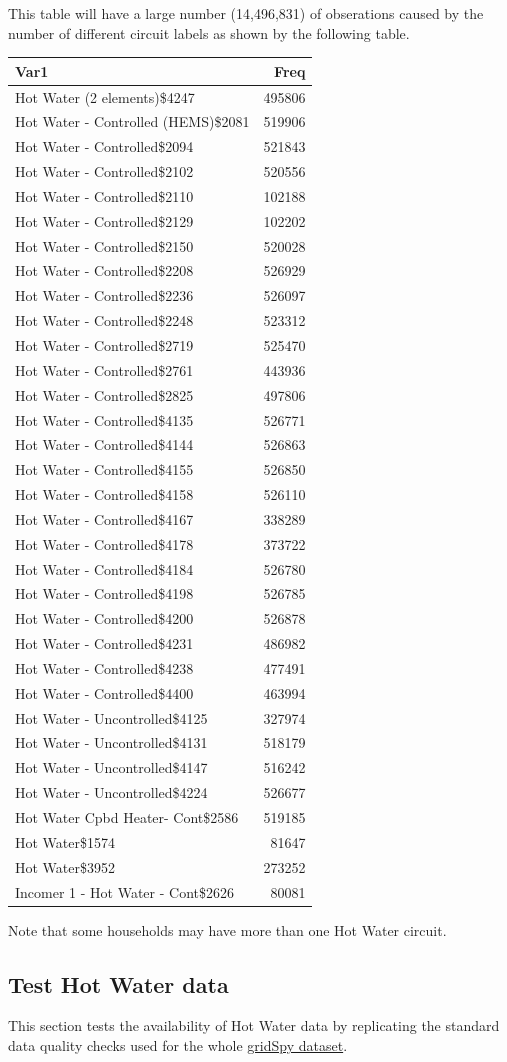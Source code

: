 \documentclass[]{article}
\begin{document}
This table will have a large number (14,496,831) of obserations caused
by the number of different circuit labels as shown by the following
table.

\begin{longtable}[]{@{}lr@{}}
\toprule
Var1 & Freq\tabularnewline
\midrule
\endhead
Hot Water (2 elements)\$4247 & 495806\tabularnewline
Hot Water - Controlled (HEMS)\$2081 & 519906\tabularnewline
Hot Water - Controlled\$2094 & 521843\tabularnewline
Hot Water - Controlled\$2102 & 520556\tabularnewline
Hot Water - Controlled\$2110 & 102188\tabularnewline
Hot Water - Controlled\$2129 & 102202\tabularnewline
Hot Water - Controlled\$2150 & 520028\tabularnewline
Hot Water - Controlled\$2208 & 526929\tabularnewline
Hot Water - Controlled\$2236 & 526097\tabularnewline
Hot Water - Controlled\$2248 & 523312\tabularnewline
Hot Water - Controlled\$2719 & 525470\tabularnewline
Hot Water - Controlled\$2761 & 443936\tabularnewline
Hot Water - Controlled\$2825 & 497806\tabularnewline
Hot Water - Controlled\$4135 & 526771\tabularnewline
Hot Water - Controlled\$4144 & 526863\tabularnewline
Hot Water - Controlled\$4155 & 526850\tabularnewline
Hot Water - Controlled\$4158 & 526110\tabularnewline
Hot Water - Controlled\$4167 & 338289\tabularnewline
Hot Water - Controlled\$4178 & 373722\tabularnewline
Hot Water - Controlled\$4184 & 526780\tabularnewline
Hot Water - Controlled\$4198 & 526785\tabularnewline
Hot Water - Controlled\$4200 & 526878\tabularnewline
Hot Water - Controlled\$4231 & 486982\tabularnewline
Hot Water - Controlled\$4238 & 477491\tabularnewline
Hot Water - Controlled\$4400 & 463994\tabularnewline
Hot Water - Uncontrolled\$4125 & 327974\tabularnewline
Hot Water - Uncontrolled\$4131 & 518179\tabularnewline
Hot Water - Uncontrolled\$4147 & 516242\tabularnewline
Hot Water - Uncontrolled\$4224 & 526677\tabularnewline
Hot Water Cpbd Heater- Cont\$2586 & 519185\tabularnewline
Hot Water\$1574 & 81647\tabularnewline
Hot Water\$3952 & 273252\tabularnewline
Incomer 1 - Hot Water - Cont\$2626 & 80081\tabularnewline
\bottomrule
\end{longtable}

Note that some households may have more than one Hot Water circuit.

\subsection{Test Hot Water data}\label{test-hot-water-data}

This section tests the availability of Hot Water data by replicating the
standard data quality checks used for the whole
\href{https://git.soton.ac.uk/ba1e12/nzGREENGrid/tree/master/dataProcessing/gridSpy}{gridSpy
dataset}.
\end{document}
